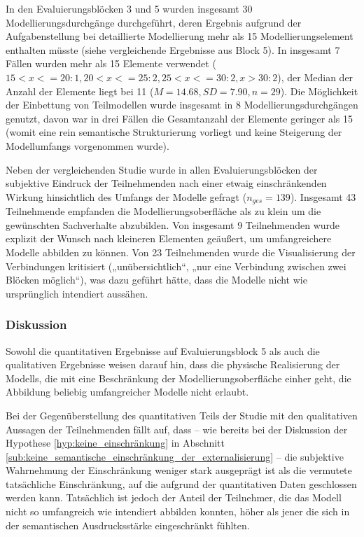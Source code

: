 In den Evaluierungsblöcken 3 und 5 wurden insgesamt 30 Modellierungsdurchgänge durchgeführt, deren Ergebnis aufgrund der Aufgabenstellung bei detaillierte Modellierung mehr als 15 Modellierungselement enthalten müsste (siehe vergleichende Ergebnisse aus Block 5). In insgesamt 7 Fällen wurden mehr als 15 Elemente verwendet ($15<x<=20: 1, 20<x<=25: 2, 25<x<=30: 2, x>30: 2$), der Median der Anzahl der Elemente liegt bei 11 ($M=14.68, SD=7.90, n=29$). Die Möglichkeit der Einbettung von Teilmodellen wurde insgesamt in 8 Modellierungsdurchgängen genutzt, davon war in drei Fällen die Gesamtanzahl der Elemente geringer als 15 (womit eine rein semantische Strukturierung vorliegt und keine Steigerung der Modellumfangs vorgenommen wurde).

Neben der vergleichenden Studie wurde in allen Evaluierungsblöcken der subjektive Eindruck der Teilnehmenden nach einer etwaig einschränkenden Wirkung hinsichtlich des Umfangs der Modelle gefragt ($n_{ges}=139$). Insgesamt 43 Teilnehmende empfanden die Modellierungsoberfläche als zu klein um die gewünschten Sachverhalte abzubilden. Von insgesamt 9 Teilnehmenden wurde explizit der Wunsch nach kleineren Elementen geäußert, um umfangreichere Modelle abbilden zu können. Von 23 Teilnehmenden wurde die Visualisierung der Verbindungen kritisiert („unübersichtlich“, „nur eine Verbindung zwischen zwei Blöcken möglich“), was dazu geführt hätte, dass die Modelle nicht wie ursprünglich intendiert aussähen.

\subsubsection{Diskussion} %

Sowohl die quantitativen Ergebnisse auf Evaluierungsblock 5 als auch die qualitativen Ergebnisse weisen darauf hin, dass die physische Realisierung der Modells, die mit eine Beschränkung der Modellierungsoberfläche einher geht, die Abbildung beliebig umfangreicher Modelle nicht erlaubt.

Bei der Gegenüberstellung des quantitativen Teils der Studie mit den qualitativen Aussagen der Teilnehmenden fällt auf, dass -- wie bereits bei der Diskussion der Hypothese \ref{hyp:keine_einschränkung} in Abschnitt \ref{sub:keine_semantische_einschränkung_der_externalisierung} -- die subjektive Wahrnehmung der Einschränkung weniger stark ausgeprägt ist als die vermutete tatsächliche Einschränkung, auf die aufgrund der quantitativen Daten geschlossen werden kann. Tatsächlich ist jedoch der Anteil der Teilnehmer, die das Modell nicht so umfangreich wie intendiert abbilden konnten, höher als jener die sich in der semantischen Ausdrucksstärke eingeschränkt fühlten.


